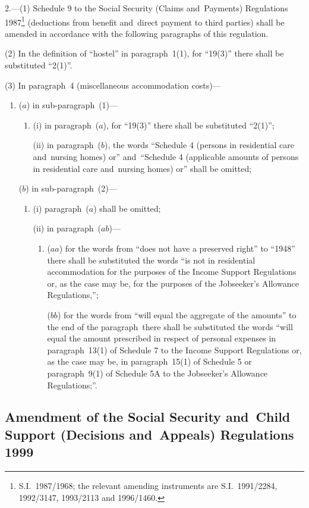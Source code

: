 \documentclass[12pt,a4paper]{article}
\begin{document}
2.---(1)  Schedule 9 to the Social Security (Claims and~Payments) Regulations 1987\footnote{S.I.~1987/1968; the relevant amending instruments are S.I.~1991/2284, 1992/3147, 1993/2113 and 1996/1460.} (deductions from benefit and~direct payment to third parties) shall be amended in accordance with the following paragraphs of this regulation.

(2) In the definition of “hostel” in paragraph~1(1), for “19(3)” there shall be substituted “2(1)”.

(3) In paragraph~4 (miscellaneous accommodation costs)—
\begin{enumerate}\item[]
($a$) in sub-paragraph~(1)—
\begin{enumerate}\item[]
(i) in paragraph~($a$), for “19(3)” there shall be substituted “2(1)”;

(ii) in paragraph~($b$), the words “Schedule 4 (persons in residential care and~nursing homes) or” and~“Schedule 4 (applicable amounts of persons in residential care and~nursing homes) or” shall be omitted;
\end{enumerate}

($b$) in sub-paragraph~(2)—
\begin{enumerate}\item[]
(i) paragraph~($a$)  shall be omitted;

(ii) in paragraph~($ab$)—
\begin{enumerate}\item[]
($aa$) for the words from “does not have a preserved right” to “1948” there shall be substituted the words “is not in residential accommodation for the purposes of the Income Support Regulations or, as the case may be, for the purposes of the Jobseeker’s Allowance Regulations,”;

($bb$) for the words from “will equal the aggregate of the amounts” to the end of the paragraph~there shall be substituted the words “will equal the amount prescribed in respect of personal expenses in paragraph~13(1) of Schedule 7 to the Income Support Regulations or, as the case may be, in paragraph~15(1) of Schedule 5 or paragraph~9(1) of Schedule 5A to the Jobseeker’s Allowance Regulations;”.
\end{enumerate}
\end{enumerate}
\end{enumerate}

\subsection[3. Amendment of the Social Security and~Child Support (Decisions and~Appeals) Regulations 1999]{Amendment of the Social Security and~Child Support (Decisions and~Appeals) Regulations 1999}
\end{document}
